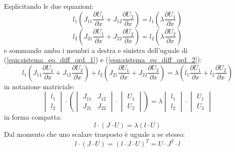 \documentclass[12pt]{article} %
\begin{document}
\noindent Esplicitando le due equazioni:
\begin{equation}
    l_1\left(J_{11}\frac{\partial U_1}{\partial x}+J_{12}\frac{\partial U_2}{\partial x}\right) = l_1\left(\lambda\frac{\partial U_1}{\partial x}\right)
    \label{eqn:sistema_eq_diff_ord_1}
\end{equation}
\begin{equation}
    l_2\left(J_{21}\frac{\partial U_1}{\partial x}+J_{22}\frac{\partial U_2}{\partial x}\right) = l_2\left(\lambda\frac{\partial U_2}{\partial x}\right)
    \label{eqn:sistema_eq_diff_ord_2}
\end{equation}
\noindent e sommando ambo i membri a destra e sinistra dell'uguale di (\ref{eqn:sistema_eq_diff_ord_1}) e (\ref{eqn:sistema_eq_diff_ord_2}):
\begin{equation}
    l_1\left(J_{11}\frac{\partial U_1}{\partial x}+J_{12}\frac{\partial U_2}{\partial x}\right)+l_2\left(J_{21}\frac{\partial U_1}{\partial x}+J_{22}\frac{\partial U_2}{\partial x}\right) = \lambda\left(l_1\frac{\partial U_1}{\partial x}+l_2\frac{\partial U_2}{\partial x}\right)
\end{equation}
\noindent in notazione matriciale:
\begin{equation}
    \begin{vmatrix}l_1 \\ l_2\end{vmatrix}\cdot 
    \left(\begin{vmatrix}J_{11}&J_{12}\\J_{21}&J_{22}\end{vmatrix}\cdot\begin{vmatrix}U_1\\U_2\end{vmatrix}\right) = \lambda\begin{vmatrix}l_1 \\ l_2\end{vmatrix}\cdot\begin{vmatrix}U_1\\U_2\end{vmatrix}
    \label{eqn:sist_iperb_scal_matr}
\end{equation}
\noindent in forma compatta:
\begin{equation}
    l \cdot\left(J \cdot U\right)=\lambda\left(l \cdot U\right)
\end{equation}
\noindent Dal momento che uno scalare trasposto è uguale a se stesso:
\begin{equation}
    l \cdot\left(J \cdot U\right)=\left(l \cdot J \cdot U\right)^T=U \cdot J^T \cdot l
\end{equation}
\end{document}
